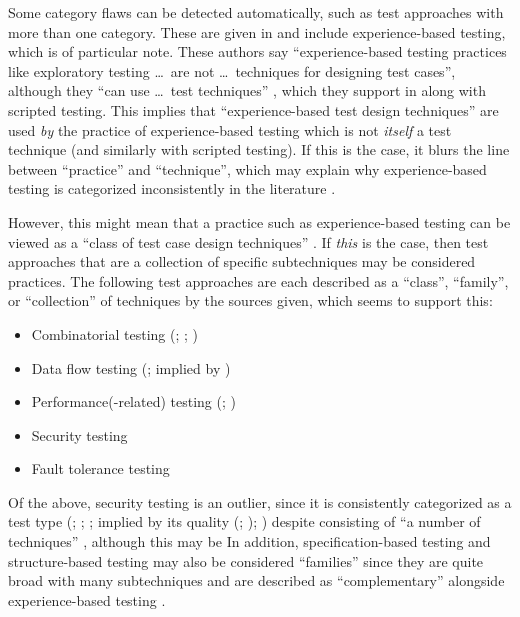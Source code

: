 \ifnotpaper\else\fi

\label{multiCats}

Some category flaws can be detected automatically, such as test
approaches with more than one category. These are given in 
and include experience-based testing, which is of particular note.
\expBasedCatMain{} These authors say ``experience-based testing practices like
exploratory testing \dots\ are not \dots\ techniques for designing test cases'',
although they ``can use \dots\ test techniques'' \citeyearpar[p.~viii]{IEEE2021},
which they support in \citeyearpar[p.~33]{IEEE2022} along with scripted testing.
This implies that ``experience-based test design techniques'' are used \emph{by}
the practice of experience-based testing which is not \emph{itself} a test
technique (and similarly with scripted testing). If this is the case, it blurs
the line between ``practice'' and ``technique'', which may explain why
experience-based testing is categorized inconsistently in the literature%
.

\ifnotpaper
    \label{classFamilyFlaw}
    However, this might mean that a practice such as experience-based testing
    can be viewed as a ``class of test case design techniques''
    \citep[p.~4]{IEEE2022}. If \emph{this} is the case, then test approaches
    that are a collection of specific subtechniques may be considered
    practices. The following test approaches are each described as a ``class'',
    ``family'', or ``collection'' of techniques by the sources given, which
    seems to support this:
    \begin{itemize}
        \item Combinatorial testing (\citealp[p.~3]{IEEE2022};
              \citeyear[p.~2]{IEEE2021}; \citealp[p.~5-11]{SWEBOK2024})
        \item Data flow testing (\citeyear[p.~3]{IEEE2021};
              implied by \citealp[p.~5-13]{SWEBOK2024})
        \item Performance(-related) testing (\citealp[p.~38]{IEEE2021};
              \perfAsFamily*{})
        \item Security testing \citep[implied by][p.~40]{IEEE2021}
        \item Fault tolerance testing \citep[implied by][p.~4\=/11]{SWEBOK2024}
    \end{itemize}
    Of the above, security testing is an outlier, since it is consistently
    categorized as a test type (\citealp[pp.~9, 22, 26--27]{IEEE2022};
    \citeyear[pp.~7, 40, Tab.~A.1]{IEEE2021}; \citeyear[p.~405]{IEEE2017}%
    ; implied by its quality (\citealp{ISO_IEC2023a};
    \citealp[p.~13-4]{SWEBOK2024}); \citealp[p.~53]{Firesmith2015}) despite
    consisting of ``a number of techniques'' \cite[p.~40]{IEEE2021}, although
    this may be  In addition, specification-based
    testing and structure-based testing may also be considered ``families''
    since they are quite broad with many subtechniques and are described as
    ``complementary'' alongside experience-based testing
    \citep[p.~8, Fig.~2]{IEEE2021}.
\fi

